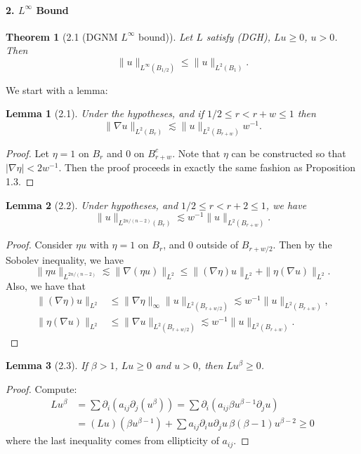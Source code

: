 \documentclass[UTF8,11pt]{ctexart}
\newtheorem*{theorem}{Theorem}
\newtheorem*{lemma}{Lemma}
\theoremstyle{definition}
\begin{document}
\paragraph{2. $L^\infty$ Bound}
\begin{theorem}[2.1 (DGNM $L^\infty$ bound)]
Let $L$ satisfy (DGH), $Lu\geq0$, $u>0$. Then
\[\|u\|_{L^\infty(B_{1/2})}\leq\|u\|_{L^2(B_1)}.\]
\end{theorem}
We start with a lemma:
\begin{lemma}[2.1]
Under the hypotheses, and if $1/2\leq r<r+w\leq1$ then
\[\|\nabla u\|_{L^2(B_r)}\lesssim\|u\|_{L^2(B_{r+w})}w^{-1}.\]
\end{lemma}
\begin{proof}
Let $\eta=1$ on $B_r$ and $0$ on $B_{r+w}^c$. Note that $\eta$ can be constructed so that $|\nabla\eta|<2w^{-1}$. Then the proof proceeds in exactly the same fashion as Proposition 1.3.
\end{proof}
\begin{lemma}[2.2]
Under hypotheses, and $1/2\leq r<r+2\leq1$, we have
\[\|u\|_{L^{2n/(n-2)}(B_r)}\lesssim w^{-1}\|u\|_{L^2(B_{r+w})}.\]
\end{lemma}
\begin{proof}
Consider $\eta u$ with $\eta=1$ on $B_r$, and $0$ outside of $B_{r+w/2}$. Then by the Sobolev inequality, we have
\[\|\eta u\|_{L^{2n/(n-2)}}\lesssim\|\nabla(\eta u)\|_{L^2}\leq\|(\nabla\eta)u\|_{L^2}+\|\eta(\nabla u)\|_{L^2}.\]
Also, we have that
\begin{align*}
\|(\nabla\eta)u\|_{L^2}&\leq\|\nabla\eta\|_\infty\|u\|_{L^2(B_{r+w/2})}\lesssim w^{-1}\|u\|_{L^2(B_{r+w})},\\
\|\eta(\nabla u)\|_{L^2}&\leq\|\nabla u\|_{L^2(B_{r+w/2})}\lesssim w^{-1}\|u\|_{L^2(B_{r+w})}.
\end{align*}
\end{proof}
\begin{lemma}[2.3]
If $\beta>1$, $Lu\geq0$ and $u>0$, then $Lu^\beta\geq0$.
\end{lemma}
\begin{proof}
Compute:
\begin{align*}
Lu^\beta&=\sum\partial_i(a_{ij}\partial_j(u^\beta))=\sum\partial_i(a_{ij}\beta u^{\beta-1}\partial_j u)\\
&=(Lu)(\beta u^{\beta-1})+\sum a_{ij}\partial_i u\partial_j u\,\beta(\beta-1)u^{\beta-2}\geq0
\end{align*}
where the last inequality comes from ellipticity of $a_{ij}$.
\end{proof}
\end{document}
